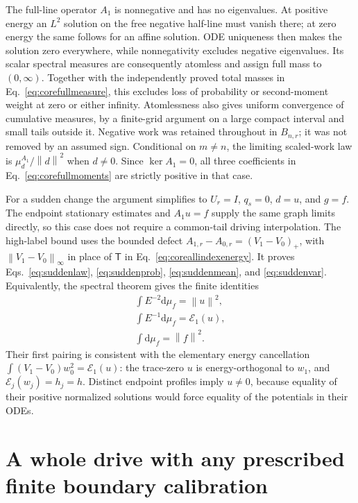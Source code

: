 \documentclass[aps,pra,reprint,superscriptaddress,longbibliography]{revtex4-2}
\newcommand{\dd}{\mathrm d}
\newcommand{\calE}{\mathcal E}
\newcommand{\norm}[1]{\left\lVert#1\right\rVert}
\begin{document}
The full-line operator $A_1$ is nonnegative and has no eigenvalues. At
positive energy an $L^2$ solution on the free negative half-line must
vanish there; at zero energy the same follows for an affine solution.
ODE uniqueness then makes the solution zero everywhere, while
nonnegativity excludes negative eigenvalues. Its scalar spectral
measures are consequently atomless and assign full mass to
$(0,\infty)$. Together with the independently proved total masses in
Eq.~\eqref{eq:corefullmeasure}, this excludes loss of probability or
second-moment weight at zero or either infinity. Atomlessness also
gives uniform convergence of cumulative measures, by a finite-grid
argument on a large compact interval and small tails outside it.
Negative work was retained throughout in $B_{n,r}$; it was not removed
by an assumed sign. Conditional on $m\ne n$, the limiting scaled-work
law is $\mu_d^{A_1}/\norm d^2$ when $d\ne0$. Since $\ker A_1=0$, all
three coefficients in Eq.~\eqref{eq:corefullmoments} are strictly
positive in that case.

For a sudden change the argument simplifies to $U_r=I$, $q_s=0$,
$d=u$, and $g=f$. The endpoint stationary estimates and
$A_1u=f$ supply the same graph limits directly, so this case does not
require a common-tail driving interpolation. The high-label bound uses
the bounded defect $A_{1,r}-A_{0,r}=(V_1-V_0)_+$, with
$\norm{V_1-V_0}_\infty$ in place of $\mathsf T$ in
Eq.~\eqref{eq:coreallindexenergy}. It proves
Eqs.~\eqref{eq:suddenlaw}, \eqref{eq:suddenprob},
\eqref{eq:suddenmean}, and \eqref{eq:suddenvar}. Equivalently, the
spectral theorem gives the finite identities
\begin{equation}
 \begin{gathered}
 \int E^{-2}\dd\mu_f=\norm u^2,\\
 \int E^{-1}\dd\mu_f=\calE_1(u),\\
 \int\dd\mu_f=\norm f^2.
 \end{gathered}
 \label{eq:coresuddenspectralmoments}
\end{equation}
Their first pairing is consistent with the elementary energy
cancellation
$\int(V_1-V_0)w_0^2=\calE_1(u)$: the trace-zero $u$ is
energy-orthogonal to $w_1$, and
$\calE_j(w_j)=h_j=h$. Distinct endpoint profiles imply $u\ne0$, because
equality of their positive normalized solutions would force equality
of the potentials in their ODEs.

\section{A whole drive with any prescribed finite boundary calibration}
\label{app:corejets}
\end{document}
